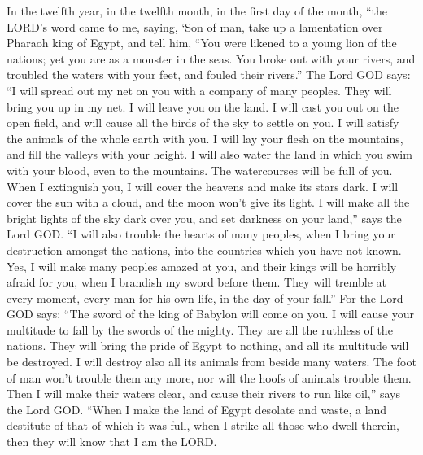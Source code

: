  In the twelfth year, in the twelfth month, in the first day
of the month, ``the LORD's word came to me, saying,  `Son of
man, take up a lamentation over Pharaoh king of Egypt, and tell him,
``You were likened to a young lion of the nations; yet you are as a
monster in the seas. You broke out with your rivers, and troubled the
waters with your feet, and fouled their rivers.''  The Lord
GOD says: ``I will spread out my net on you with a company of many
peoples. They will bring you up in my net.  I will leave you
on the land. I will cast you out on the open field, and will cause all
the birds of the sky to settle on you. I will satisfy the animals of the
whole earth with you.  I will lay your flesh on the
mountains, and fill the valleys with your height.  I will
also water the land in which you swim with your blood, even to the
mountains. The watercourses will be full of you.  When I
extinguish you, I will cover the heavens and make its stars dark. I will
cover the sun with a cloud, and the moon won't give its light.
 I will make all the bright lights of the sky dark over you,
and set darkness on your land,'' says the Lord GOD.  ``I
will also trouble the hearts of many peoples, when I bring your
destruction amongst the nations, into the countries which you have not
known.  Yes, I will make many peoples amazed at you, and
their kings will be horribly afraid for you, when I brandish my sword
before them. They will tremble at every moment, every man for his own
life, in the day of your fall.''  For the Lord GOD says:
``The sword of the king of Babylon will come on you.  I
will cause your multitude to fall by the swords of the mighty. They are
all the ruthless of the nations. They will bring the pride of Egypt to
nothing, and all its multitude will be destroyed.  I will
destroy also all its animals from beside many waters. The foot of man
won't trouble them any more, nor will the hoofs of animals trouble them.
 Then I will make their waters clear, and cause their
rivers to run like oil,'' says the Lord GOD.  ``When I make
the land of Egypt desolate and waste, a land destitute of that of which
it was full, when I strike all those who dwell therein, then they will
know that I am the LORD.

